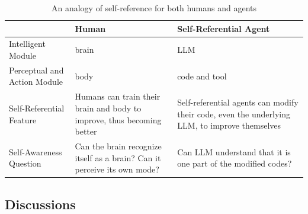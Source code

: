 \label{sec:future}
\label{app:future}

\begin{table}[t]
\centering

\begin{tabularx}{\textwidth}{@{}lL L@{}} %
\toprule
                          & \textbf{Human}                                                                         & \textbf{Self-Referential Agent}                                                                 \\ \midrule
Intelligent Module        & brain                                                                                  & LLM                                                                                             \\
Perceptual and Action Module    & body                                                                                   & code and tool                                                                                   \\
Self-Referential Feature  & Humans can train their brain and body to improve, thus becoming better                 & Self-referential agents can modify their code, even the underlying LLM, to improve themselves \\
Self-Awareness Question           & Can the brain recognize itself as a brain? Can it perceive its own mode?               & Can LLM understand that it is one part of the modified codes?                               \\ \bottomrule
\end{tabularx}
\caption{An analogy of self-reference for both humans and agents}
\label{tab:self_reference_analogy}
\end{table}


\subsection{Discussions}

